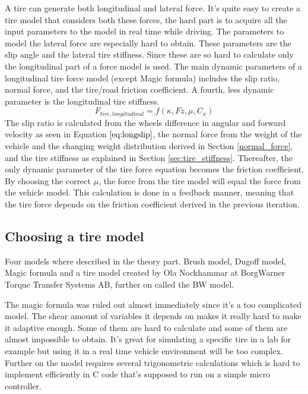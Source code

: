 A tire can generate both longitudinal and lateral force. It's quite easy to create a tire model that considers both these forces, the hard part is to acquire all the input parameters to the model in real time while driving. The parameters to model the lateral force are especially hard to obtain. These parameters are the slip angle and the lateral tire stiffness. Since these are so hard to calculate only the longitudinal part of a force model is used. The main dynamic parameters of a longitudinal tire force model (except Magic formula) includes the slip ratio, normal force, and the tire/road friction coefficient. A fourth, less dynamic parameter is the longitudinal tire stiffness. 
\begin{equation}
F_{tire, longitudinal} = f(\kappa, Fz, \mu, C_{x})
\end{equation}
The slip ratio is calculated from the wheels difference in angular and forward velocity as seen in Equation $ \ref{eq:longslip} $, the normal force from the weight of the vehicle and the changing weight distribution derived in  Section \ref{normal_force}, and the tire stiffness as explained in Section \ref{sec:tire_stiffness}. Thereafter, the only dynamic parameter of the tire force equation becomes the friction coefficient. By choosing the correct $ \mu $, the force from the tire model will equal the force from the vehicle model. This calculation is done in a feedback manner, meaning that the tire force depends on the friction coefficient derived in the previous iteration.

\subsection{Choosing a tire model}
Four models where described in the theory part. Brush model, Dugoff model, Magic formula and a tire model created by Ola Nockhammar at BorgWarner Torque Transfer Systems AB, further on called the BW model.

The magic formula was ruled out almost immediately since it's a too complicated model. The shear amount of variables it depends on makes it really hard to make it adaptive enough. Some of them are hard to calculate and some of them are almost impossible to obtain. It's great for simulating a specific tire in a lab for example but using it in a real time vehicle environment will be too complex. Further on the model requires several trigonometric calculations which is hard to implement efficiently in C code that's supposed to run on a simple micro controller. 

